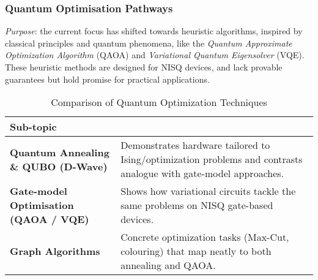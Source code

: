 \subsubsection{Quantum Optimisation Pathways}

\emph{Purpose}: the current focus has shifted towards heuristic algorithms, inspired by classical principles and quantum phenomena, 
like the \emph{Quantum Approximate Optimization Algorithm} (QAOA) and \emph{Variational Quantum Eigensolver} (VQE).
These heuristic methods are designed for NISQ devices, and lack provable guarantees but hold promise for practical applications.
 
\begin{table}[ht]
	\centering
	\begin{tabular}{|p{4cm}p{10.25cm}|}
		\hline
		\textbf{Sub-topic} & \textbf{} \\
		\hline
		\textbf{Quantum Annealing \& QUBO (D-Wave)} & Demonstrates hardware tailored to Ising/optimization problems and contrasts analogue with gate-model approaches. \\
		\hline
		\textbf{Gate-model Optimisation (QAOA / VQE)} & Shows how variational circuits tackle the same problems on NISQ gate-based devices. \\
		\hline
		\textbf{Graph Algorithms} & Concrete optimization tasks (Max-Cut, colouring) that map neatly to both annealing and QAOA. \\
		\hline
	\end{tabular}
	\vspace{4pt}
	\caption{Comparison of Quantum Optimization Techniques}
\end{table}



